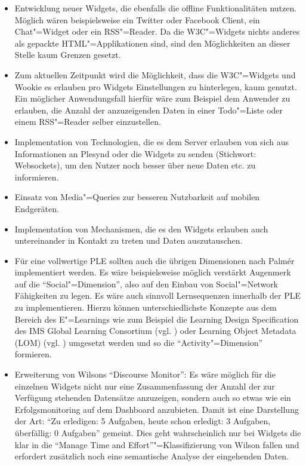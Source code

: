 \begin{itemize}
 \item Entwicklung neuer Widgets, die ebenfalls die offline Funktionalitäten nutzen. Möglich wären beispielsweise ein Twitter oder Facebook Client, ein Chat"=Widget oder ein \ac{RSS}"=Reader. Da die \ac{W3C}"=Widgets nichts anderes als gepackte \ac{HTML}"=Applikationen sind, sind den Möglichkeiten an dieser Stelle kaum Grenzen gesetzt.
 \item Zum aktuellen Zeitpunkt wird die Möglichkeit, dass die \ac{W3C}"=Widgets und Wookie es erlauben pro Widgets Einstellungen zu hinterlegen, kaum genutzt. Ein möglicher Anwendungsfall hierfür wäre zum Beispiel dem Anwender zu erlauben, die Anzahl der anzuzeigenden Daten in einer Todo"=Liste oder einem \ac{RSS}"=Reader selber einzustellen.
 \item Implementation von Technologien, die es dem Server erlauben von sich aus Informationen an Plesynd oder die Widgets zu senden (Stichwort: Websockets), um den Nutzer noch besser über neue Daten etc. zu informieren.
 \item Einsatz von Media"=Queries zur besseren Nutzbarkeit auf mobilen Endgeräten.
 \item Implementation von Mechanismen, die es den Widgets erlauben auch untereinander in Kontakt zu treten und Daten auszutauschen.
 \item Für eine vollwertige \ac{PLE} sollten auch die übrigen Dimensionen nach Palmér implementiert werden. Es wäre beispielsweise möglich verstärkt Augenmerk auf die "`Social"=Dimension"', also auf den Einbau von Social"=Network Fähigkeiten zu legen. Es wäre auch sinnvoll Lernsequenzen innerhalb der \ac{PLE} zu implementieren. Hierzu können unterschiedlichste Konzepte aus dem Bereich des E"=Learnings wie zum Beispiel die Learning Design Specification des IMS Global Learning Consortium (vgl. \cite{IMS2012}) oder Learning Object Metadata (LOM) (vgl. \cite{LOM2002}) umgesetzt werden und so die "`Activity"=Dimension"' formieren.
 \item Erweiterung von Wilsons "`Discourse Monitor"': Es wäre möglich für die einzelnen Widgets nicht nur eine Zusammenfassung der Anzahl der zur Verfügung stehenden Datensätze anzuzeigen, sondern auch so etwas wie ein Erfolgsmonitoring auf dem Dashboard anzubieten. Damit ist eine Darstellung der Art: "`Zu erledigen: 5 Aufgaben, heute schon erledigt: 3 Aufgaben, überfällig: 0 Aufgaben"' gemeint. Dies geht wahrscheinlich nur bei Widgets die klar in die “Manage Time and Effort”"=Klassifizierung von Wilson fallen und erfordert zusätzlich noch eine semantische Analyse der eingehenden Daten.
\end{itemize}

